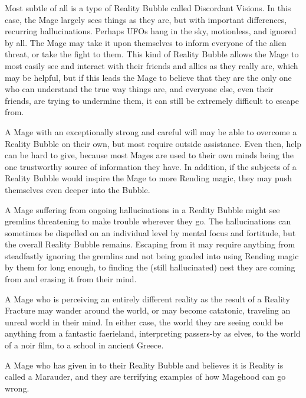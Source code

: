 \documentclass[letterpaper,12pt]{article}
\begin{document}
Most subtle of all is a type of Reality Bubble called Discordant
Visions. In this case, the Mage largely sees things as they are, but
with important differences, recurring hallucinations. Perhaps UFOs
hang in the sky, motionless, and ignored by all. The Mage may take it
upon themselves to inform everyone of the alien threat, or take the
fight to them. This kind of Reality Bubble allows the Mage to most
easily see and interact with their friends and allies as they really
are, which may be helpful, but if this leads the Mage to believe that
they are the only one who can understand the true way things are, and
everyone else, even their friends, are trying to undermine
them, it can still be extremely difficult to escape from.

A Mage with an exceptionally strong and careful will may be
able to overcome a Reality Bubble on their own, but most require
outside assistance. Even then, help can be hard to give, because most
Mages are used to their own minds being the one trustworthy source of
information they have. In addition, if the subjects of a Reality
Bubble would inspire the Mage to more Rending magic, they may push
themselves even deeper into the Bubble.

A Mage suffering from ongoing hallucinations in a Reality Bubble might
see gremlins threatening to make trouble wherever they go. The
hallucinations can sometimes be dispelled on an individual level by
mental focus and fortitude, but the overall Reality Bubble
remains. Escaping from it may require anything from steadfastly
ignoring the gremlins and not being goaded into using Rending magic by
them for long enough, to finding the (still hallucinated) nest they
are coming from and erasing it from their mind.

A Mage who is perceiving an entirely different reality as the result
of a Reality Fracture may wander around the world, or may become
catatonic, traveling an unreal world in their mind. In either case,
the world they are seeing could be anything from a fantastic
faerieland, interpreting passers-by as elves, to the world of a noir
film, to a school in ancient Greece.

A Mage who has given in to their Reality Bubble and believes it is
Reality is called a Marauder, and they are terrifying examples of how
Magehood can go wrong.

\end{document}
